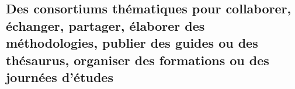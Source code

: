 \documentclass[
  letterpaper,
  DIV=11,
  numbers=noendperiod]{scrreport}
\begin{document}
\subsection{\texorpdfstring{Des \textbf{consortiums} thématiques pour
collaborer, échanger, partager, élaborer des méthodologies, publier des
guides ou des thésaurus, organiser des formations ou des journées
d'études}{Des consortiums thématiques pour collaborer, échanger, partager, élaborer des méthodologies, publier des guides ou des thésaurus, organiser des formations ou des journées d'études}}\label{des-consortiums-thuxe9matiques-pour-collaborer-uxe9changer-partager-uxe9laborer-des-muxe9thodologies-publier-des-guides-ou-des-thuxe9saurus-organiser-des-formations-ou-des-journuxe9es-duxe9tudes}

\begin{figure}


\end{figure}
\end{document}
